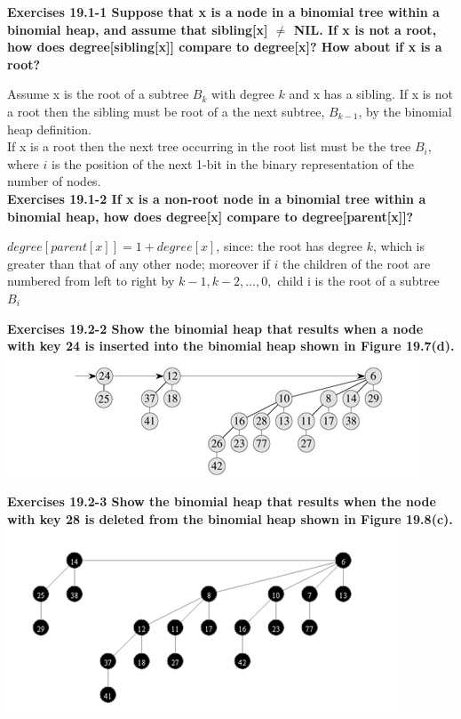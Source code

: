 \documentclass[10pt,fullpage]{article}
\begin{document}
\newpage

\textbf{Exercises 19.1-1 Suppose that x is a node in a binomial tree
within a binomial heap, and assume that sibling[x] $\neq$ NIL. If x
is not a root, how does degree[sibling[x]] compare to degree[x]? How
about if x is a root? }

Assume x is the root of a subtree $B_k$ with degree $k$ and x has a
sibling. If x is not a root then the sibling must be root of a the
next subtree, $B_{k-1}$, by the binomial heap definition.\\
If x is a root then the next tree occurring in the root list must be
the tree $B_i$, where $i$ is the position of the next 1-bit in
the binary representation of the number of nodes.\\

\textbf{Exercises 19.1-2 If x is a non-root node in a binomial tree
within a binomial heap, how does degree[x] compare to
degree[parent[x]]? }

$degree[parent[x]] = 1 + degree[x] $, since:
the root has degree $k$, which is greater than that of any other node; moreover if $i$ the children of the root are numbered from left to right by $k - 1, k - 2, \ldots, 0,$ child i is the root of a subtree $B_i$\\

\newpage

\textbf{Exercises 19.2-2 Show the binomial heap that results when a
node with key 24 is inserted into the binomial heap shown in Figure
19.7(d). }\\

\includegraphics{fig1907D.png}

\textbf{Exercises 19.2-3 Show the binomial heap that results when
the node with key 28 is deleted from the binomial heap shown in
Figure 19.8(c). }\\

\includegraphics{fig1908C.png}

\newpage
\end{document}
